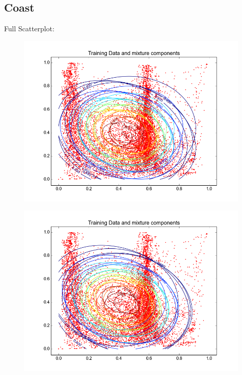 \documentclass[11pt,a4paper]{article}
\begin{document}
\subsection{Coast}
Full Scatterplot: \\
\begin{minipage}[b]{0.25\textwidth}
\begin{figure}[H]
  \centering
  \includegraphics[width=.8\linewidth]{Figures/contourscoast0.png}
  \label{fig:sfig1}
\end{figure}%
\end{minipage}
\begin{minipage}[b]{0.25\textwidth}
\begin{figure}[H]
  \centering
  \includegraphics[width=.8\linewidth]{Figures/contourscoast5.png}

  \label{fig:sfig1}
\end{figure}%
\end{minipage}
\end{document}
